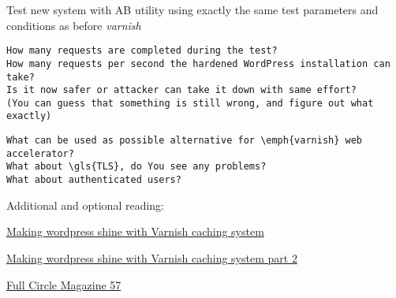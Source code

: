 Test new system with AB utility using exactly the same test parameters and conditions as before \emph{varnish}


\begin{Verbatim}[samepage=true,frame=single,
label=Discussion,framesep=2mm,rulecolor=\color{blue},commandchars=\\\{\}]
How many requests are completed during the test?
How many requests per second the hardened WordPress installation can take?
Is it now safer or attacker can take it down with same effort? 
(You can guess that something is still wrong, and figure out what exactly)
\end{Verbatim}


\begin{Verbatim}[samepage=true,frame=single,
label=Discussion,framesep=2mm,rulecolor=\color{blue},commandchars=\\\{\}]
What can be used as possible alternative for \emph{varnish} web accelerator?
What about \gls{TLS}, do You see any problems?
What about authenticated users?
\end{Verbatim}

Additional and optional reading:

\href{http://kaanon.com/blog/work/making-wordpress-shine-varnish-caching-system-part-1}{Making wordpress shine with Varnish caching system}

\href{http://kaanon.com/blog/varnish/making-wordpress-shine-varnish-caching-system-part-2}{Making wordpress shine with Varnish caching system part 2}

\href{http://www.google.com/producer/editions/CAowvZtX/full_circle_magazine_57_lite}
{Full Circle Magazine 57}

